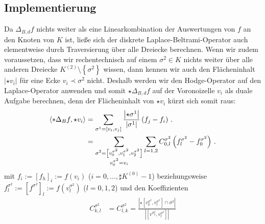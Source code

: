   \subsection{Implementierung}
    \label{subsecLaplaceImplementierung}
    Da \( \Delta_{B,d} f \) nichts weiter als eine Linearkombination der Auswertungen von \( f \) an den
    Knoten von \( K \) ist, ließe sich der diskrete Laplace-Beltrami-Operator auch elementweise durch
    Traversierung über alle Dreiecke berechnen.
    Wenn wir zudem voraussetzen, dass wir rechentechnisch auf einem \( \sigma^{2}\in K \) nichts weiter
    über alle anderen Dreiecke \( K^{(2)}\setminus\left\{ \sigma^{2} \right\} \) wissen, 
    dann kennen wir auch den Flächeninhalt \( \left| \star v_{i} \right| \) für eine Ecke 
    \( v_{i}\prec\sigma^{2} \) nicht.
    Deshalb werden wir den Hodge-Operator auf den Laplace-Operator anwenden und somit \( \star\Delta_{B,d} f \)
    auf der Voronoizelle \( v_{i} \) als duale Aufgabe berechnen, 
    denn der Flächeninhalt von \( \star v_{i} \) kürzt sich
    somit raus:
    \begin{align}
      \left\langle *\Delta_{B} f , \star v_{i} \right\rangle
          &= \sum_{\sigma^{1}=\left[ v_{i}, v_{j} \right]} 
                       \frac{\left| \star\sigma^{1} \right|}{\left| \sigma^{1} \right|}
                       \left( f_{j} - f_{i} \right) \,\text{.} \\
          &= \sum_{\substack{\sigma^{2}=\left[ v^{\sigma^{2}}_{0},v^{\sigma^{2}}_{1},v^{\sigma^{2}}_{2} \right]\\
                                               v^{\sigma^{2}}_{0} = v_{i}}}
                  \sum_{l=1,2} C^{\sigma^{2}}_{0,l} 
                          \left( f^{\sigma^{2}}_{l} -  f^{\sigma^{2}}_{0}\right) \,\text{.}
          \label{eqLaplaceElementSummanden}
    \end{align}
    mit \( f_{i} := \left[ f_{h} \right]_{i} := f(v_{i}) \) (\( i=0,\ldots,\sharp K^{(0)}-1 \)) 
    beziehungsweise 
    \( f^{\sigma^{2}}_{l} := \left[ f^{\sigma^{2}} \right]_{l}:=f(v^{\sigma^{2}}_{l})\) 
    (\( l=0,1,2 \))
    und den Koeffizienten
    \begin{align}
      C^{\sigma^{2}}_{k,l} &= C^{\sigma^{2}}_{l,k}
                            = \frac{\left| \star \left[ v^{\sigma^{2}}_{k}, v^{\sigma^{2}}_{l} \right] 
                                            \cap \sigma^{2}\right|}
                                   {\left| \left[ v^{\sigma^{2}_{k}}, v^{\sigma^{2}}_{l} \right] \right|}
    \end{align}
